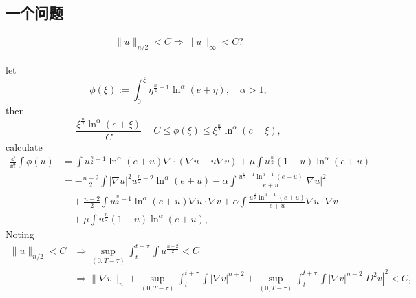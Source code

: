 \subsection{一个问题}
\begin{align*}
	\|u\|_{n/2} < C \Rightarrow \|u\|_\infty < C ?
\end{align*}

let 
\[
	\phi(\xi):= \int_0^\xi \eta^{\frac{n}{2}-1}\ln^{\alpha}(e+\eta), \quad\alpha>1,
\]
then
\[
	\frac{\xi^{\frac{n}{2}}\ln^{\alpha}(e+\xi)}{C} - C 
	\leq \phi(\xi) 
	\leq \xi^{\frac{n}{2}}\ln^{\alpha}(e+\xi),
\]
calculate
\begin{align*}
	\frac{\dd}{\dd t}\int \phi(u) 
	&= \int u^{\frac{n}{2} - 1}\ln^{\alpha}(e+u) \nabla\cdot(\nabla u - u\nabla v)
		+ \mu\int u^{\frac{n}{2}}(1-u)\ln^{\alpha}(e+u)\\
	&= -\frac{n-2}{2}\int |\nabla u|^2u^{\frac{n}{2}-2}\ln^\alpha(e+u)
		- \alpha\int\frac{u^{\frac{n}{2}-1}\ln^{\alpha-1}(e+u)}{e+u}|\nabla u|^2\\
		&\quad + \frac{n-2}{2}\int u^{\frac{n}{2}-1}\ln^\alpha(e+u)\nabla u\cdot\nabla v 
			+ \alpha\int \frac{u^{\frac{n}{2}}\ln^{\alpha-1}(e+u)}{e+u} \nabla u \cdot \nabla v\\
		&\quad + \mu\int u^{\frac{n}{2}}(1-u)\ln^{\alpha}(e+u),
\end{align*}
Noting
\begin{align*}
	\|u\|_{n/2} < C 
	&\Rightarrow \sup_{(0,T-\tau)}\int_t^{t+\tau} \int u^{\frac{n+2}{2}} < C \\
	&\Rightarrow \|\nabla v\|_n 
		+ \sup_{(0,T-\tau)}\int_t^{t+\tau}\int |\nabla v|^{n+2}
		+ \sup_{(0,T-\tau)}\int_t^{t+\tau}\int  |\nabla v|^{n-2}|D^2v|^2 < C,
\end{align*}

